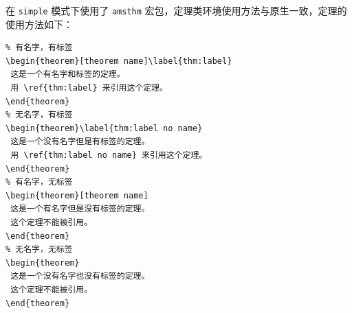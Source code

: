 \documentclass[lang=cn,newtx,10pt,scheme=chinese,pad,twocol]{zznote}
\begin{document}
在 \lstinline{simple} 模式下使用了 \lstinline{amsthm} 宏包，定理类环境使用方法与原生一致，定理的使用方法如下：

\begin{lstlisting}
% 有名字，有标签
\begin{theorem}[theorem name]\label{thm:label}
 这是一个有名字和标签的定理。
 用 \ref{thm:label} 来引用这个定理。
\end{theorem}
% 无名字，有标签
\begin{theorem}\label{thm:label no name}
 这是一个没有名字但是有标签的定理。
 用 \ref{thm:label no name} 来引用这个定理。
\end{theorem}
% 有名字，无标签
\begin{theorem}[theorem name]
 这是一个有名字但是没有标签的定理。
 这个定理不能被引用。
\end{theorem}
% 无名字，无标签
\begin{theorem}
 这是一个没有名字也没有标签的定理。
 这个定理不能被引用。
\end{theorem}
\end{lstlisting}


\end{document}
